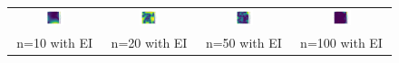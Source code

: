 \documentclass[11pt]{article}
\begin{document}
\begin{figure}[H]
    \centering
    \begin{tabular}{cccc}
        \includegraphics[width=0.225\textwidth]{../Task-02/plots/gp_std_rbf_n10_EI.png} &
        \includegraphics[width=0.225\textwidth]{../Task-02/plots/gp_std_rbf_n20_EI.png} &
        \includegraphics[width=0.225\textwidth]{../Task-02/plots/gp_std_rbf_n50_EI.png} &
        \includegraphics[width=0.225\textwidth]{../Task-02/plots/gp_std_rbf_n100_EI.png} \\
        n=10 with EI & n=20 with EI & n=50 with EI & n=100 with EI \\[0.5em]
        

\end{tabular}
\end{figure}
\end{document}
